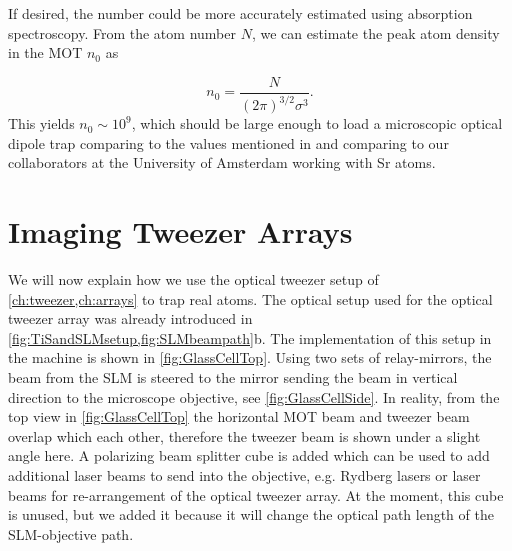 If desired, the number could be more accurately estimated using absorption spectroscopy.
From the atom number $N$, we can estimate the peak atom density in the MOT $n_0$ as \cite{Townsend1995}

\begin{equation}
    n_0 = \frac{N}{(2\pi)^{3/2}\sigma^3}.
\end{equation}
This yields $n_0 \sim 10^9$, which should be large enough to load a microscopic optical dipole trap comparing to the values mentioned in \cite{Schlosser2002} and comparing to our collaborators at the University of Amsterdam working with Sr atoms.


\section{Imaging Tweezer Arrays}\label{sec:Tweezers}

We will now explain how we use the optical tweezer setup of \cref{ch:tweezer,ch:arrays} to trap real atoms. 
The optical setup used for the optical tweezer array was already introduced in \cref{fig:TiSandSLMsetup,fig:SLMbeampath}b.
The implementation of this setup in the machine is shown in \cref{fig:GlassCellTop}.
Using two sets of relay-mirrors, the beam from the \ac{SLM} is steered to the mirror sending the beam in vertical direction to the microscope objective, see \cref{fig:GlassCellSide}. 
In reality, from the top view in \cref{fig:GlassCellTop} the horizontal MOT beam and tweezer beam overlap which each other, therefore the tweezer beam is shown under a slight angle here.
A polarizing beam splitter cube is added which can be used to add additional laser beams to send into the objective, e.g. Rydberg lasers or laser beams for re-arrangement of the optical tweezer array. 
At the moment, this cube is unused, but we added it because it will change the optical path length of the SLM-objective path.

